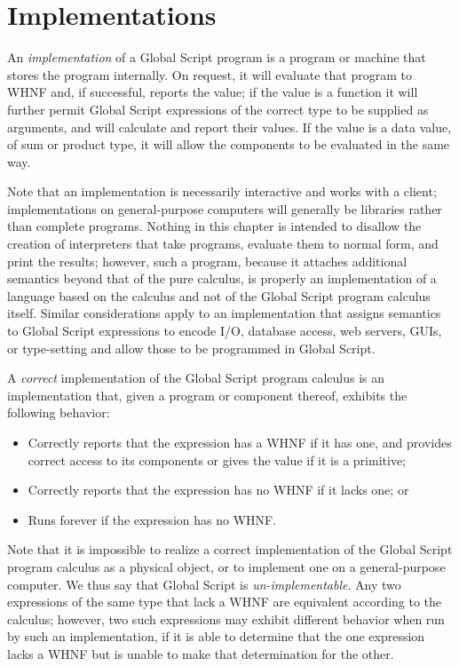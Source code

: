 \documentclass{report}
\newcommand\defn[1]{\emph{#1}}
\begin{document}
\section{Implementations}

An \defn{implementation} of a Global Script program is a program or machine that stores the program internally.
On request, it will evaluate that program to WHNF and, if successful, reports the value;
if the value is a function it will further permit Global Script expressions of the correct type to be supplied as arguments,
and will calculate and report their values.
If the value is a data value, of sum or product type, it will allow the components to be evaluated in the same way.

Note that an implementation is necessarily interactive and works with a client;
implementations on general-purpose computers will generally be libraries rather than complete programs.
Nothing in this chapter is intended to disallow the creation of interpreters that take programs, evaluate them to normal form, and print the results;
however, such a program, because it attaches additional semantics beyond that of the pure calculus,
is properly an implementation of a language based on the calculus and not of the Global Script program calculus itself.
Similar considerations apply to an implementation that assigns semantics to Global Script expressions to encode
I/O, database access, web servers, GUIs, or type-setting
and allow those to be programmed in Global Script.

A \defn{correct} implementation of the Global Script program calculus is an implementation that, given a program or component thereof,
exhibits the following behavior:
\begin{itemize}
  \item Correctly reports that the expression has a WHNF if it has one, and provides correct access to its components or gives the value if it is a primitive;
  \item Correctly reports that the expression has no WHNF if it lacks one; or
  \item Runs forever if the expression has no WHNF.
\end{itemize}
Note that it is impossible to realize a correct implementation of the Global Script program calculus as a physical object,
or to implement one on a general-purpose computer.
We thus say that Global Script is \defn{un-implementable}.
Any two expressions of the same type that lack a WHNF are equivalent according to the calculus;
however, two such expressions may exhibit different behavior when run by such an implementation,
if it is able to determine that the one expression lacks a WHNF but is unable to make that determination for the other.
\end{document}
